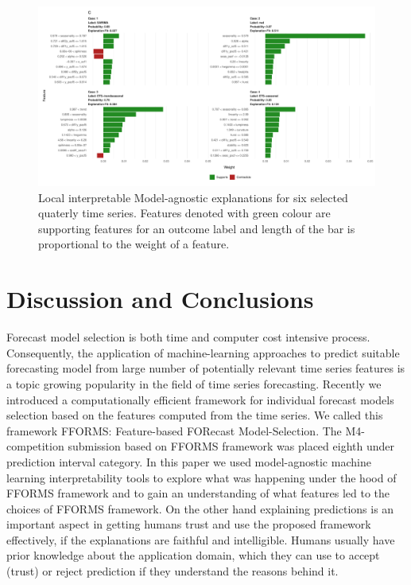 \documentclass[11pt,a4paper,]{article}
\begin{document}
\begin{figure}[h]

{\centering \includegraphics{figures/quarterlylime2-1} 

}

\caption{Local interpretable Model-agnostic explanations for six selected quaterly time series. Features denoted with green colour are supporting features for an outcome label and length of the bar is proportional to the weight of a feature.}\label{fig:quarterlylime2}
\end{figure}

\clearpage

\section{Discussion and Conclusions}\label{conclusions}

Forecast model selection is both time and computer cost intensive
process. Consequently, the application of machine-learning approaches to
predict suitable forecasting model from large number of potentially
relevant time series features is a topic growing popularity in the field
of time series forecasting. Recently we introduced a computationally
efficient framework for individual forecast models selection based on
the features computed from the time series. We called this framework
FFORMS: Feature-based FORecast Model-Selection. The M4-competition
submission based on FFORMS framework was placed eighth under prediction
interval category. In this paper we used model-agnostic machine learning
interpretability tools to explore what was happening under the hood of
FFORMS framework and to gain an understanding of what features led to
the choices of FFORMS framework. On the other hand explaining
predictions is an important aspect in getting humans trust and use the
proposed framework effectively, if the explanations are faithful and
intelligible. Humans usually have prior knowledge about the application
domain, which they can use to accept (trust) or reject prediction if
they understand the reasons behind it.
\end{document}
